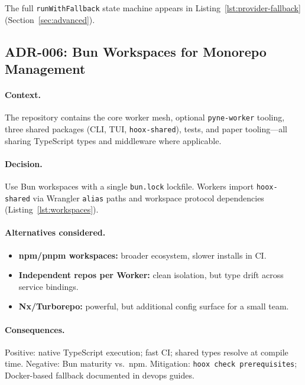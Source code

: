 
The full \texttt{runWithFallback} state machine appears in Listing~\ref{lst:provider-fallback} (Section~\ref{sec:advanced}).

\subsection{ADR-006: Bun Workspaces for Monorepo Management}

\paragraph{Context.} The repository contains the core worker mesh, optional \texttt{pyne-worker} tooling, three shared packages (CLI, TUI, \texttt{hoox-shared}), tests, and paper tooling---all sharing TypeScript types and middleware where applicable.

\paragraph{Decision.} Use Bun workspaces with a single \texttt{bun.lock} lockfile. Workers import \texttt{hoox-shared} via Wrangler \texttt{alias} paths and workspace protocol dependencies (Listing~\ref{lst:workspaces}).

\paragraph{Alternatives considered.}
\begin{itemize}
  \item \textbf{npm/pnpm workspaces:} broader ecosystem, slower installs in CI.
  \item \textbf{Independent repos per Worker:} clean isolation, but type drift across service bindings.
  \item \textbf{Nx/Turborepo:} powerful, but additional config surface for a small team.
\end{itemize}

\paragraph{Consequences.} Positive: native TypeScript execution; fast CI; shared types resolve at compile time. Negative: Bun maturity vs.\ npm. Mitigation: \texttt{hoox check prerequisites}; Docker-based fallback documented in devops guides.

